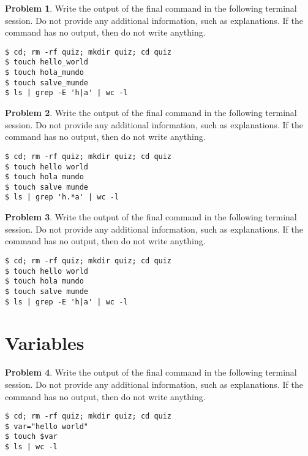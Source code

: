 \documentclass[10pt]{article}
\theoremstyle{definition}
\newtheorem{problem}{Problem}
\begin{document}
\begin{samepage}
\begin{problem}
Write the output of the final command in the following terminal session.
Do not provide any additional information,
such as explanations.
If the command has no output,
then do not write anything.

\end{problem}
\begin{lstlisting}
$ cd; rm -rf quiz; mkdir quiz; cd quiz
$ touch hello_world
$ touch hola_mundo
$ touch salve_munde
$ ls | grep -E 'h|a' | wc -l
\end{lstlisting}
\end{samepage}


\begin{samepage}
\begin{problem}
Write the output of the final command in the following terminal session.
Do not provide any additional information,
such as explanations.
If the command has no output,
then do not write anything.

\end{problem}
\begin{lstlisting}
$ cd; rm -rf quiz; mkdir quiz; cd quiz
$ touch hello world
$ touch hola mundo
$ touch salve munde
$ ls | grep 'h.*a' | wc -l
\end{lstlisting}
\end{samepage}


\begin{samepage}
\begin{problem}
Write the output of the final command in the following terminal session.
Do not provide any additional information,
such as explanations.
If the command has no output,
then do not write anything.

\end{problem}
\begin{lstlisting}
$ cd; rm -rf quiz; mkdir quiz; cd quiz
$ touch hello world
$ touch hola mundo
$ touch salve munde
$ ls | grep -E 'h|a' | wc -l
\end{lstlisting}
\end{samepage}

\section{Variables}

\begin{samepage}
\begin{problem}
Write the output of the final command in the following terminal session.
Do not provide any additional information,
such as explanations.
If the command has no output,
then do not write anything.

\end{problem}
\begin{lstlisting}
$ cd; rm -rf quiz; mkdir quiz; cd quiz
$ var="hello world"
$ touch $var
$ ls | wc -l
\end{lstlisting}
\end{samepage}
\end{document}

